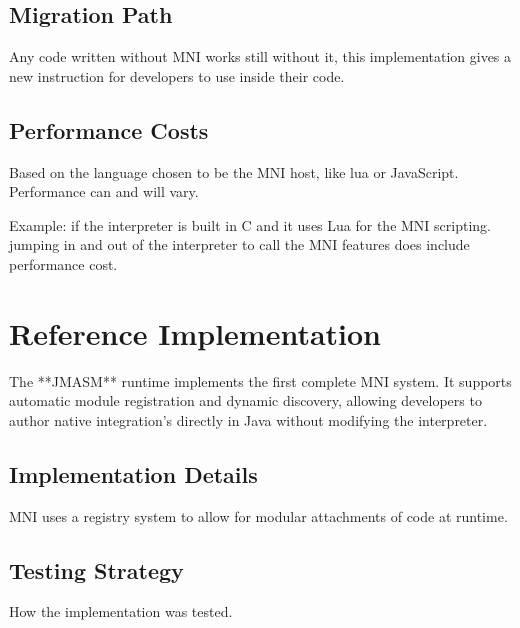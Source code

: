 \documentclass[11pt]{article}
\begin{document}
	
	\subsection{Migration Path}
 	Any code written without MNI works still without it, this implementation gives a new instruction for developers to use inside their code.
	
	\subsection{Performance Costs}
	Based on the language chosen to be the MNI host, like lua or JavaScript.
	Performance can and will vary.
	
	Example: if the interpreter is built in C and it uses Lua for the MNI scripting.
	jumping in and out of the interpreter to call the MNI features does include performance cost.
	
	\section{Reference Implementation}
	The **JMASM** runtime implements the first complete MNI system.  
	It supports automatic module registration and dynamic discovery, allowing developers to author native integration's directly in Java without modifying the interpreter.
	
	\subsection{Implementation Details}
	MNI uses a registry system to allow for modular attachments of code at runtime.
	\subsection{Testing Strategy}
	How the implementation was tested.
	
	
\end{document}
